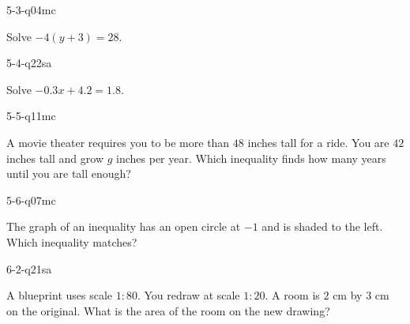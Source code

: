 \begin{practiceQuestion}{5-3-q04}{mc}
\begin{questionText}
Solve $-4(y + 3) = 28$.
\end{questionText}
\end{practiceQuestion}

\begin{practiceQuestion}{5-4-q22}{sa}
\begin{questionText}
Solve $-0.3x + 4.2 = 1.8$.
\end{questionText}
\end{practiceQuestion}

\begin{practiceQuestion}{5-5-q11}{mc}
\begin{questionText}
A movie theater requires you to be more than $48$ inches tall for a ride. You are $42$ inches tall and grow $g$ inches per year. Which inequality finds how many years until you are tall enough?
\end{questionText}
\end{practiceQuestion}

\begin{practiceQuestion}{5-6-q07}{mc}
\begin{questionText}
The graph of an inequality has an open circle at $-1$ and is shaded to the left. Which inequality matches?
\end{questionText}
\end{practiceQuestion}

\begin{practiceQuestion}{6-2-q21}{sa}
\begin{questionText}
A blueprint uses scale $1:80$. You redraw at scale $1:20$. A room is $2$ cm by $3$ cm on the original. What is the area of the room on the new drawing?
\end{questionText}
\end{practiceQuestion}


